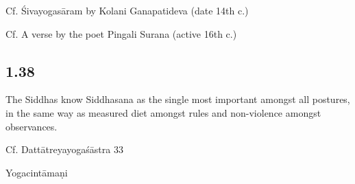 \begin{ekdosis}
\begin{testimonia}[hp01_037]
Cf. Śivayogasāram by Kolani Ganapatideva (date 14th c.)

\begin{versinnote}
\end{versinnote}

Cf. A verse by the poet Pingali Surana (active 16th c.)

\begin{versinnote}
\end{versinnote}

\end{testimonia}

\subsection*{1.38}
\begin{translation}[hp01_038]
The Siddhas know Siddhasana as the single most important amongst
all postures, in the same way as measured diet amongst rules and non-violence amongst observances.
\end{translation}

\begin{sources}[hp01_038]
Cf. Dattātreyayogaśāstra 33

\begin{versinnote}
\end{versinnote}

\end{sources}

\begin{testimonia}[hp01_038]
Yogacintāmaṇi

\begin{versinnote}
\end{versinnote}


\end{testimonia}
\end{ekdosis}
